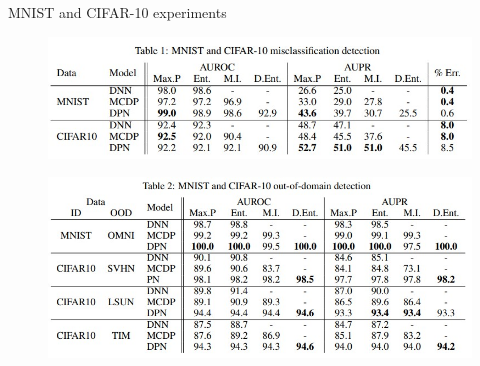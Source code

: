 \documentclass{beamer}
\begin{document}
\begin{frame}{MNIST and CIFAR-10 experiments}
    \begin{figure}[h]
        \includegraphics[scale=0.5]{images/table1.jpg}
     \end{figure}
     \begin{figure}[h]
        \includegraphics[scale=0.5]{images/table2.jpg}
     \end{figure}
\end{frame}
\end{document}
